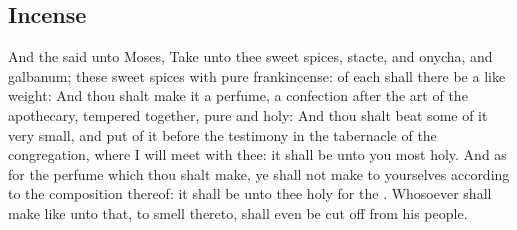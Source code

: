 \begin{biblechapter}
\section*{Incense}
\verse And the \LORD said unto Moses, Take unto thee sweet spices, stacte, and onycha, and galbanum; these sweet spices with pure frankincense: of each shall there be a like weight:
\verse And thou shalt make it a perfume, a confection after the art of the apothecary, tempered together, pure and holy:
\verse And thou shalt beat some of it very small, and put of it before the testimony in the tabernacle of the congregation, where I will meet with thee: it shall be unto you most holy.
\verse And as for the perfume which thou shalt make, ye shall not make to yourselves according to the composition thereof: it shall be unto thee holy for the \LORD.
\verse Whosoever shall make like unto that, to smell thereto, shall even be cut off from his people.
\end{biblechapter}

